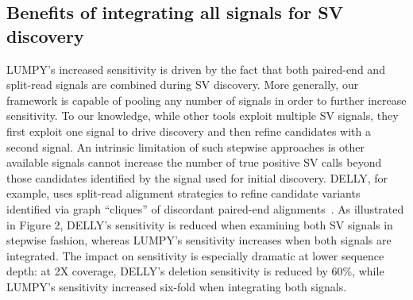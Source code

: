 \documentclass[10pt]{bmc_article}
\newenvironment{bmcformat}{\begin{raggedright}\baselineskip20pt\sloppy\setboolean{publ}{false}}{\end{raggedright}\baselineskip20pt\sloppy}
\begin{document}
\begin{bmcformat}
%


\subsection*{Benefits of integrating all signals for SV discovery}

LUMPY's increased sensitivity is driven by the fact that both paired-end and
split-read signals are combined during SV discovery. More generally, our
framework is capable of pooling any number of signals in order to further
increase sensitivity. To our knowledge, while other tools exploit multiple SV
signals, they first exploit one signal to drive discovery and then refine
candidates with a second signal. An intrinsic limitation of such stepwise
approaches is other available signals cannot increase the number of true
positive SV calls beyond those candidates identified by the signal used for
initial discovery. DELLY, for example, uses split-read alignment strategies to
refine candidate variants identified via graph ``cliques'' of discordant
paired-end alignments~\cite{rausch2012b}. As illustrated in Figure 2, DELLY's
sensitivity is reduced when examining both SV signals in stepwise fashion,
whereas LUMPY's sensitivity increases when both signals are integrated. The
impact on sensitivity is especially dramatic at lower sequence depth: at 2X
coverage, DELLY's deletion sensitivity is reduced by 60\%, while LUMPY's
sensitivity increased six-fold when integrating both signals.


\end{bmcformat}
\end{document}

